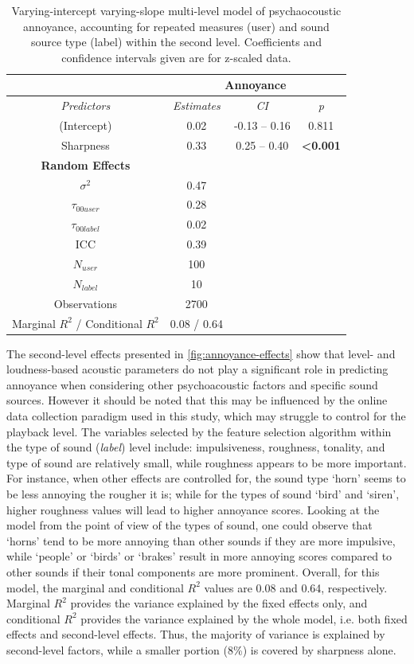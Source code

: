 \begin{table}[h]
  \centering
  \caption{Varying-intercept varying-slope multi-level model of psychaocoustic annoyance, accounting for repeated measures (user) and sound source type (label) within the second level. Coefficients and confidence intervals given are for z-scaled data. \label{tab:annoyance-model}}
  \begin{tabular}{cccc} 
  \toprule
   & \multicolumn{3}{c}{\textbf{Annoyance }} \\ 
  \hline
  \textit{Predictors} & \textit{Estimates} & \textit{CI} & \textit{p} \\ 
  \hline
  (Intercept) & 0.02 & -0.13 -- 0.16 & 0.811 \\
  Sharpness & 0.33 & 0.25 -- 0.40 & \textbf{\textless{}0.001} \\ 
  \hline
  \textbf{Random Effects} &  &  &  \\ 
  \hline
  $\sigma^2$ & 0.47 &  &  \\
  $\tau_{00user}$ & 0.28 &  &  \\
  $\tau_{00label}$ & 0.02 &  &  \\
  ICC & 0.39 &  &  \\
  $N_{user}$ & 100 &  &  \\
  $N_{label}$ & 10 &  &  \\ 
  \hline
  Observations & 2700 &  &  \\
  Marginal $R^2$ / Conditional $R^2$ & 0.08 / 0.64 &  &  \\
  \bottomrule
  \end{tabular}
  \end{table}

The second-level effects presented in \cref{fig:annoyance-effects} show that level- and loudness-based acoustic parameters do not play a significant role in predicting annoyance when considering other psychoacoustic factors and specific sound sources. However it should be noted that this may be influenced by the online data collection paradigm used in this study, which may struggle to control for the playback level. The variables selected by the feature selection algorithm within the type of sound (\emph{label}) level include: impulsiveness, roughness, tonality, and type of sound are relatively small, while roughness appears to be more important. For instance, when other effects are controlled for, the sound type `horn' seems to be less annoying the rougher it is; while for the types of sound `bird' and `siren', higher roughness values will lead to higher annoyance scores. Looking at the model from the point of view of the types of sound, one could observe that `horns' tend to be more annoying than other sounds if they are more impulsive, while `people' or `birds' or `brakes' result in more annoying scores compared to other sounds if their tonal components are more prominent. Overall, for this model, the marginal and conditional $R^2$ values are 0.08 and 0.64, respectively. Marginal $R^2$ provides the variance explained by the fixed effects only, and conditional $R^2$ provides the variance explained by the whole model, i.e. both fixed effects and second-level effects. Thus, the majority of variance is explained by second-level factors, while a smaller portion (8\%) is covered by sharpness alone.

